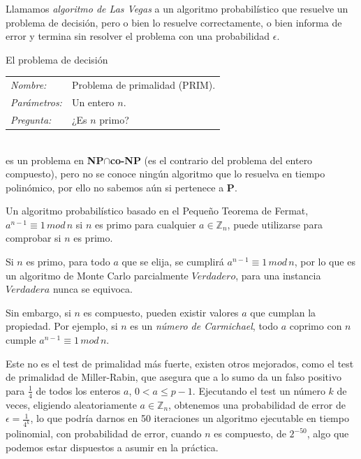 \begin{definition}
	Llamamos \textit{algoritmo de Las Vegas} a un algoritmo probabilístico que resuelve un problema de decisión, pero o bien lo resuelve correctamente, o bien informa de error y termina sin resolver el problema con una probabilidad $\epsilon$.
\end{definition}



\begin{example}
	El problema de decisión
	
	\begin{tabular}{|ll}
		\textit{Nombre:} & Problema de primalidad (PRIM). \\
		\textit{Parámetros:} & Un entero $n$. \\
		\textit{Pregunta:} & ¿Es $n$ primo? \\
	\end{tabular}
	\\
	es un problema en \textbf{NP}$\cap$\textbf{co-NP} (es el contrario del problema del entero compuesto), pero no se conoce ningún algoritmo que lo resuelva en tiempo polinómico, por ello no sabemos aún si pertenece a \textbf{P}.
	
	Un algoritmo probabilístico basado en el Pequeño Teorema de Fermat, $a^{n-1} \equiv 1 \, mod \, n$ si $n$ es primo para cualquier $a\in \mathbb{Z}_n$, puede utilizarse para comprobar si $n$ es primo.
	
	Si $n$ es primo, para todo $a$ que se elija, se cumplirá $a^{n-1} \equiv 1 \, mod \, n$, por lo que es un algoritmo de Monte Carlo parcialmente $Verdadero$, para una instancia $Verdadera$ nunca se equivoca.
	
	Sin embargo, si $n$ es compuesto, pueden existir valores $a$ que cumplan la propiedad. Por ejemplo, si $n$ es un \textit{número de Carmichael}, todo $a$ coprimo con $n$ cumple $a^{n-1} \equiv 1 \, mod \, n$.
	
	Este no es el test de primalidad más fuerte, existen otros mejorados, como el test de primalidad de Miller-Rabin, que asegura que a lo sumo da un falso positivo para $\frac{1}{4}$ de todos los enteros $a$, $0<a\leq p-1$. Ejecutando el test un número $k$ de veces, eligiendo aleatoriamente $a\in \mathbb{Z}_n$, obtenemos una probabilidad de error de $\epsilon=\frac{1}{4^k}$, lo que podría darnos en 50 iteraciones un algoritmo ejecutable en tiempo polinomial, con probabilidad de error, cuando $n$ es compuesto, de $2^{-50}$, algo que podemos estar dispuestos a asumir en la práctica.
	
\end{example}






